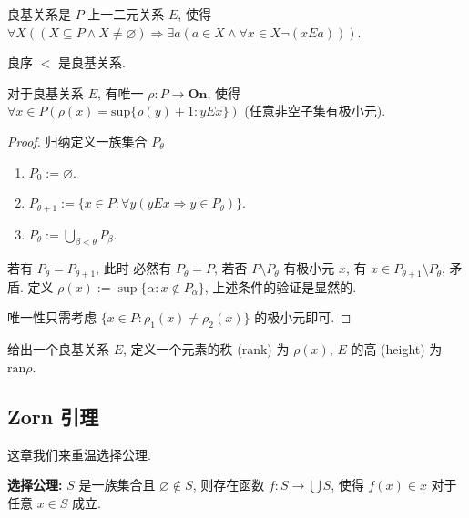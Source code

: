 \begin{definition}
    良基关系是 \(P\) 上一二元关系 \(E\), 使得 \(\forall X ((X \subseteq P \wedge X \neq \varnothing) \Rightarrow \exists a (a \in X \wedge \forall x \in X \neg(x E a)))\).
\end{definition}

\begin{example}
    良序 \(<\) 是良基关系.
\end{example}

\begin{theorem}
    对于良基关系 \(E\), 有唯一 \(\rho : P \to \mathbf{On}\), 使得 \(\forall x \in P (\rho(x) = \mathrm{sup} \{\rho(y) + 1 : y E x\})\) (任意非空子集有极小元).

    \begin{proof}
        归纳定义一族集合 \(P_\theta\)

        \begin{enumerate}
            \item \(P_0 := \varnothing\).
            \item \(P_{\theta + 1} := \{x \in P : \forall y (y E x \Rightarrow y \in P_\theta)\}\).
            \item \(P_\theta := \bigcup_{\beta < \theta} P_\beta\).
        \end{enumerate}

        若有 \(P_\theta = P_{\theta + 1}\), 此时
        必然有 \(P_\theta = P\), 若否 \(P \setminus P_\theta\) 有极小元 \(x\), 有 \(x \in P_{\theta + 1} \setminus P_{\theta}\), 矛盾.
        定义 \(\rho(x) := \sup \{\alpha : x \notin P_{\alpha}\}\), 上述条件的验证是显然的.

        唯一性只需考虑 \(\{x \in P : \rho_1 (x) \neq \rho_2 (x)\}\) 的极小元即可.
    \end{proof}
\end{theorem}

\begin{definition}
    给出一个良基关系 \(E\), 定义一个元素的秩 (rank) 为 \(\rho(x)\), \(E\) 的高 (height) 为 \(\mathrm{ran} \rho\).
\end{definition}

\subsection{Zorn 引理}

这章我们来重温选择公理.

\textbf{选择公理:} \(S\) 是一族集合且 \(\varnothing \notin S\), 则存在函数 \(f : S \to \bigcup S\), 使得 \(f(x) \in x\) 对于任意 \(x \in S\) 成立.

